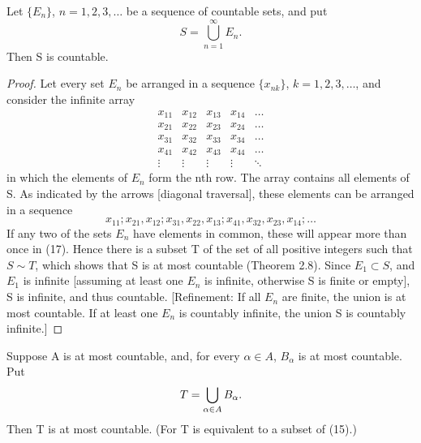 \begin{theorem} %
  \label{thm:chap2:countable_union_countable}
  Let $\{E_n\}$, $n=1, 2, 3, \dots$ be a sequence of countable sets, and put
  \begin{equation}
    S = \bigcup_{n=1}^{\infty} E_n.
  \end{equation}
  Then S is countable.
  \begin{proof}
    Let every set $E_n$ be arranged in a sequence $\{x_{nk}\}$, $k=1,
    2, 3, \dots$, and consider the infinite array
    \[
      \begin{matrix}
        x_{11} & x_{12} & x_{13} & x_{14} & \dots \\
        x_{21} & x_{22} & x_{23} & x_{24} & \dots \\
        x_{31} & x_{32} & x_{33} & x_{34} & \dots \\
        x_{41} & x_{42} & x_{43} & x_{44} & \dots \\
        \vdots & \vdots & \vdots & \vdots & \ddots
      \end{matrix}
    \]
    in which the elements of $E_n$ form the nth row. The array
    contains all elements of S. As indicated by the arrows [diagonal
    traversal], these elements can be arranged in a sequence
    \begin{equation}
      x_{11}; x_{21}, x_{12}; x_{31}, x_{22}, x_{13}; x_{41}, x_{32},
      x_{23}, x_{14}; \dots
    \end{equation}
    If any two of the sets $E_n$ have elements in common, these will
    appear more than once in (17). Hence there is a subset T of the
    set of all positive integers such that $S \sim T$, which shows
    that S is at most countable (Theorem 2.8). Since $E_1 \subset S$,
    and $E_1$ is infinite [assuming at least one $E_n$ is infinite,
    otherwise S is finite or empty], S is infinite, and thus
    countable. [Refinement: If all $E_n$ are finite, the union is at
      most countable. If at least one $E_n$ is countably infinite, the
    union S is countably infinite.]
  \end{proof}
\end{theorem}

\begin{corollary} %
  \label{cor:chap2:at_most_countable_union}
  Suppose A is at most countable, and, for every $\alpha \in A$,
  $B_\alpha$ is at most countable. Put
  \[ T = \bigcup_{\alpha \in A} B_\alpha. \]
  Then T is at most countable.
  (For T is equivalent to a subset of (15).)
\end{corollary}


